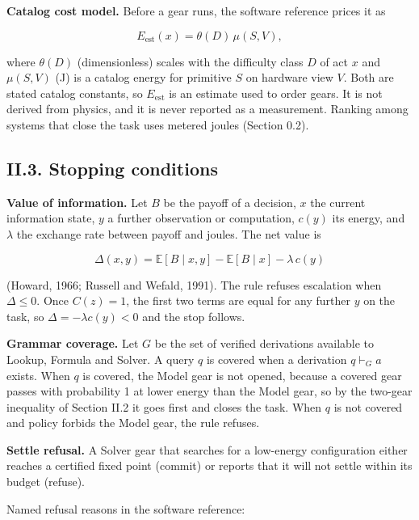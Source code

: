 \documentclass[
  10pt,
]{article}
\begin{document}
\textbf{Catalog cost model.} Before a gear runs, the software reference
prices it as

\[E_{\text{est}}(x) = \theta(D)\,\mu(S, V),\]

where \(\theta(D)\) (dimensionless) scales with the difficulty class
\(D\) of act \(x\) and \(\mu(S, V)\) (J) is a catalog energy for
primitive \(S\) on hardware view \(V\). Both are stated catalog
constants, so \(E_{\text{est}}\) is an estimate used to order gears. It
is not derived from physics, and it is never reported as a measurement.
Ranking among systems that close the task uses metered joules (Section
0.2).

\subsection{II.3. Stopping conditions}\label{ii.3.-stopping-conditions}

\textbf{Value of information.} Let \(B\) be the payoff of a decision,
\(x\) the current information state, \(y\) a further observation or
computation, \(c(y)\) its energy, and \(\lambda\) the exchange rate
between payoff and joules. The net value is

\[\Delta(x, y) = \mathbb{E}[B \mid x, y] - \mathbb{E}[B \mid x] - \lambda\, c(y)\]

(Howard, 1966; Russell and Wefald, 1991). The rule refuses escalation
when \(\Delta \le 0\). Once \(C(z) = 1\), the first two terms are equal
for any further \(y\) on the task, so \(\Delta = -\lambda c(y) < 0\) and
the stop follows.

\textbf{Grammar coverage.} Let \(G\) be the set of verified derivations
available to Lookup, Formula and Solver. A query \(q\) is covered when a
derivation \(q \vdash_G a\) exists. When \(q\) is covered, the Model
gear is not opened, because a covered gear passes with probability 1 at
lower energy than the Model gear, so by the two-gear inequality of
Section II.2 it goes first and closes the task. When \(q\) is not
covered and policy forbids the Model gear, the rule refuses.

\textbf{Settle refusal.} A Solver gear that searches for a low-energy
configuration either reaches a certified fixed point (commit) or reports
that it will not settle within its budget (refuse).

Named refusal reasons in the software reference:
\end{document}
